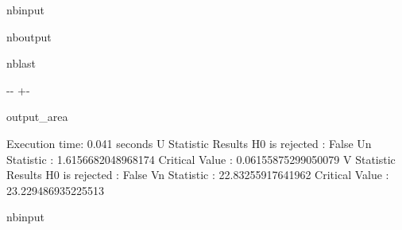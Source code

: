\documentclass[letterpaper,10pt,english,openany,oneside]{sphinxmanual}
\begin{document}
\begin{sphinxuseclass}{nbinput}
{\begin{sphinxVerbatim}[commandchars=\\\{\}]
\end{sphinxVerbatim}
}

\end{sphinxuseclass}
\begin{sphinxuseclass}{nboutput}
\begin{sphinxuseclass}{nblast}
{

\kern-\sphinxverbatimsmallskipamount\kern-\baselineskip
\kern+\FrameHeightAdjust\kern-\fboxrule
\vspace{\nbsphinxcodecellspacing}

\begin{sphinxuseclass}{output_area}
\begin{sphinxuseclass}{}


\begin{sphinxVerbatim}[commandchars=\\\{\}]
Execution time: 0.041 seconds
U Statistic Results
H0 is rejected : False
Un Statistic : 1.6156682048968174
Critical Value : 0.06155875299050079
V Statistic Results
H0 is rejected : False
Vn Statistic : 22.83255917641962
Critical Value : 23.229486935225513
\end{sphinxVerbatim}



\end{sphinxuseclass}
\end{sphinxuseclass}
}

\end{sphinxuseclass}
\end{sphinxuseclass}
\begin{sphinxuseclass}{nbinput}
{
\begin{sphinxVerbatim}[commandchars=\\\{\}]
\llap{\color{nbsphinxin}[11]:\,\hspace{\fboxrule}\hspace{\fboxsep}}
\end{sphinxVerbatim}
}

\end{sphinxuseclass}
\end{document}
